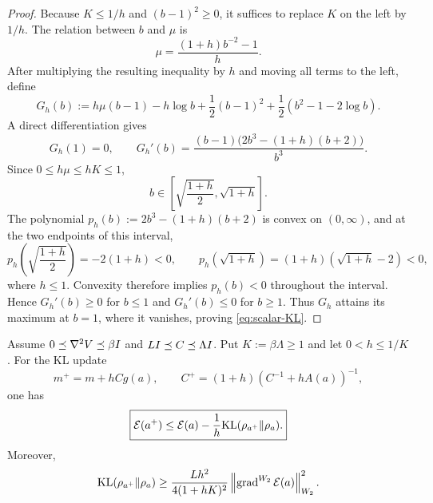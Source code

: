 \begin{proof}
Because $K\leq1/h$ and $(b-1)^2\geq0$, it suffices to replace $K$ on the left by $1/h$.
The relation between $b$ and $\mu$ is
\[
    \mu=\frac{(1+h)b^{-2}-1}{h}.
\]
After multiplying the resulting inequality by $h$ and moving all terms to the left, define
\[
    G_h(b)
    :=h\mu(b-1)-h\log b+\frac12(b-1)^2
      +\frac12(b^2-1-2\log b).
\]
A direct differentiation gives
\[
    G_h(1)=0,
    \qquad
    G_h'(b)=\frac{(b-1)\bigl(2b^3-(1+h)(b+2)\bigr)}{b^3}.
\]
Since $0\leq h\mu\leq hK\leq1$,
\[
    b\in\left[\sqrt{\frac{1+h}{2}},\sqrt{1+h}\right].
\]
The polynomial $p_h(b):=2b^3-(1+h)(b+2)$ is convex on $(0,\infty)$, and at the two
endpoints of this interval,
\[
    p_h\!\left(\sqrt{\frac{1+h}{2}}\right)=-2(1+h)<0,
    \qquad
    p_h(\sqrt{1+h})=(1+h)(\sqrt{1+h}-2)<0,
\]
where $h\leq1$.  Convexity therefore implies $p_h(b)<0$ throughout the interval.  Hence
$G_h'(b)\geq0$ for $b\leq1$ and $G_h'(b)\leq0$ for $b\geq1$.  Thus $G_h$ attains its maximum
at $b=1$, where it vanishes, proving \eqref{eq:scalar-KL}.
\end{proof}

\begin{proposition}
\label{prop:KL-onestep}
Assume $0\preceq\nabla^2V\preceq\beta I$ and
$LI\preceq C\preceq\Lambda I$.  Put $K:=\beta\Lambda\geq1$ and let
$0<h\leq1/K$.  For the KL update
\[
    m^+=m+hCg(a),
    \qquad
    C^+=(1+h)(C^{-1}+hA(a))^{-1},
\]
one has
\begin{equation}
\label{eq:KL-forward-descent}
    \boxed{
    \mathcal{E}(a^+)\leq\mathcal{E}(a)-\frac1h\mathrm{KL}(\rho_{a^+}\|\rho_a).
    }
\end{equation}
Moreover,
\begin{equation}
\label{eq:KL-forward-gradient-lower}
    \mathrm{KL}(\rho_{a^+}\|\rho_a)
    \geq
    \frac{Lh^2}{4(1+hK)^2}
    \left\lVert \operatorname{grad}^{W_2}\mathcal{E}(a)\right\rVert_{W_2}^2.
\end{equation}
\end{proposition}

